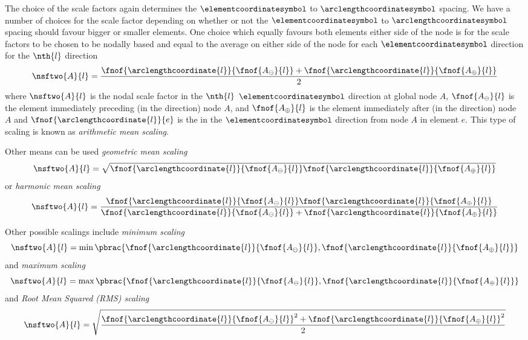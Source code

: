 The choice of the scale factors again determines the $\elementcoordinatesymbol$
to $\arclengthcoordinatesymbol$ spacing. We have a number of choices for the scale factor depending on
whether or not the $\elementcoordinatesymbol$ to $\arclengthcoordinatesymbol$ spacing should favour bigger or smaller
elements. One choice which equally favours both elements either side of the
node is for the scale factors to be chosen to be nodally based and equal to the average \arclen on either side
of the node for each $\elementcoordinatesymbol$ direction \ie for the $\nth{l}$ direction
\begin{equation}
  \nsftwo{A}{l}=\dfrac{\fnof{\arclengthcoordinate{l}}{\fnof{A_{\ominus}}{l}}+ 
    \fnof{\arclengthcoordinate{l}}{\fnof{A_{\oplus}}{l}}}{2}
  \label{eqn:arithmeanarclenscale}
\end{equation}
where $\nsftwo{A}{l}$ is the nodal scale factor in the $\nth{l}$ $\elementcoordinatesymbol$
direction at global node $A$, $\fnof{A_{\ominus}}{l}$ is the element
immediately preceding (in the  direction) node $A$, and
$\fnof{A_{\oplus}}{l}$ is the element immediately after (in the 
direction) node $A$ and $\fnof{\arclengthcoordinate{l}}{e}$ is the \arclen in the  $\elementcoordinatesymbol$
direction from node $A$ in element $e$. This type of scaling is known as
\emph{arithmetic mean \arclen scaling}.

Other means can be used \ie \emph{geometric mean \arclen scaling}
\begin{equation}
  \nsftwo{A}{l}=\sqrt{\fnof{\arclengthcoordinate{l}}{\fnof{A_{\ominus}}{l}}
    \fnof{\arclengthcoordinate{l}}{\fnof{A_{\oplus}}{l}}}
  \label{eqn:geomeanarclenscale}
\end{equation}
or \emph{harmonic mean \arclen scaling}
\begin{equation}
  \nsftwo{A}{l}=\dfrac{\fnof{\arclengthcoordinate{l}}{\fnof{A_{\ominus}}{l}}
    \fnof{\arclengthcoordinate{l}}{\fnof{A_{\oplus}}{l}}}{\fnof{\arclengthcoordinate{l}}{\fnof{A_{\ominus}}{l}}+
    \fnof{\arclengthcoordinate{l}}{\fnof{A_{\oplus}}{l}}}
  \label{eqn:harmonicmeanarclenscale}
\end{equation}

Other possible scalings include \emph{minimum \arclen scaling}
\begin{equation}
  \nsftwo{A}{l}=\min\pbrac{\fnof{\arclengthcoordinate{l}}{\fnof{A_{\ominus}}{l}},
    \fnof{\arclengthcoordinate{l}}{\fnof{A_{\oplus}}{l}}}
  \label{eqn:minimumarclenscale}
\end{equation}
and \emph{maximum \arclen scaling}
\begin{equation}
  \nsftwo{A}{l}=\max\pbrac{\fnof{\arclengthcoordinate{l}}{\fnof{A_{\ominus}}{l}},
    \fnof{\arclengthcoordinate{l}}{\fnof{A_{\oplus}}{l}}}
  \label{eqn:maximumarclenscale}
\end{equation}
and \emph{Root Mean Squared (RMS) \arclen scaling}
\begin{equation}
  \nsftwo{A}{l}=\sqrt{\dfrac{\fnof{\arclengthcoordinate{l}}{\fnof{A_{\ominus}}{l}}^{2}+
    \fnof{\arclengthcoordinate{l}}{\fnof{A_{\oplus}}{l}}^{2}}{2}}
  \label{eqn:rmsarclenscale}
\end{equation}

